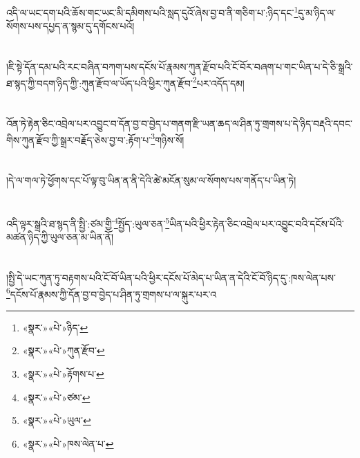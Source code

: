 འདི་ལ་ཡང་དག་པའི་ཆོས་གང་ཡང་མི་དམིགས་པའི་སླད་དུའོ་ཞེས་བྱ་བ་ནི་གཅིག་པ་:ཉིད་དང་\footnote{«སྣར་»«པེ་»ཉིད་}དུ་མ་ཉིད་ལ་སོགས་པས་དཔྱད་ན་སྙམ་དུ་དགོངས་པའོ།\chapter{ }།ཇི་སྟེ་དོན་དམ་པའི་རང་བཞིན་བཀག་པས་དངོས་པོ་རྣམས་ཀུན་རྫོབ་པའི་ངོ་བོར་བཞག་པ་གང་ཡིན་པ་དེ་ཅི་སྒྲའི་ཐ་སྙད་ཀྱི་བདག་ཉིད་ཀྱི་:ཀུན་རྫོབ་ལ་ཡོད་པའི་ཕྱིར་ཀུན་རྫོབ་\footnote{«སྣར་»«པེ་»ཀུན་རྫོབ་}པར་འདོད་དམ།\chapter{ }འོན་ཏེ་རྟེན་ཅིང་འབྲེལ་པར་འབྱུང་བ་དོན་བྱ་བ་བྱེད་པ་གནག་རྫི་ཡན་ཆད་ལ་ཤིན་ཏུ་གྲགས་པ་དེ་ཉིད་བརྡའི་དབང་གིས་ཀུན་རྫོབ་ཀྱི་སྒྲར་བརྗོད་ཅེས་བྱ་བ་:རྟོག་པ་\footnote{«སྣར་»«པེ་»རྟོགས་པ་}གཉིས་སོ།\chapter{ }།དེ་ལ་གལ་ཏེ་ཕྱོགས་དང་པོ་ལྟ་བུ་ཡིན་ན་ནི་དེའི་ཚེ་མངོན་སུམ་ལ་སོགས་པས་གནོད་པ་ཡིན་ཏེ།\chapter{ }འདི་ལྟར་སྒྲའི་ཐ་སྙད་ནི་སྤྱི་:ཙམ་གྱི་\footnote{«སྣར་»«པེ་»ཙམ་}སྤྱོད་:ཡུལ་ཅན་\footnote{«སྣར་»«པེ་»ཡུལ་}ཡིན་པའི་ཕྱིར་རྟེན་ཅིང་འབྲེལ་པར་འབྱུང་བའི་དངོས་པོའི་མཚན་ཉིད་ཀྱི་ཡུལ་ཅན་མ་ཡིན་ནོ།\chapter{ }།སྤྱི་དེ་ཡང་ཀུན་ཏུ་བརྟགས་པའི་ངོ་བོ་ཡིན་པའི་ཕྱིར་དངོས་པོ་མེད་པ་ཡིན་ན་དེའི་ངོ་བོ་ཉིད་དུ་:ཁས་ལེན་པས་\footnote{«སྣར་»«པེ་»ཁས་ལེན་པ་}དངོས་པོ་རྣམས་ཀྱི་དོན་བྱ་བ་བྱེད་པ་ཤིན་ཏུ་གྲགས་པ་ལ་སྐུར་པར་འ